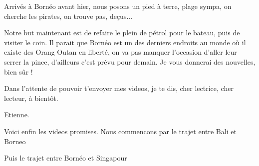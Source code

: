 \begin{multicols}{2}
Arrivés à Bornéo avant hier, nous posons un pied à terre, plage sympa, on cherche les pirates, on trouve pas, deçus...

Notre but maintenant est de refaire le plein de pétrol pour le bateau, puis de visiter le coin. Il parait que Bornéo est un des derniers endroits au monde où il existe des Orang Outan en liberté, on va pas manquer l'occasion d'aller leur serrer la pince, d'ailleurs c'est prévu pour demain. Je vous donnerai des nouvelles, bien sûr !

Dans l'attente de pouvoir t'envoyer mes videos, je te dis, cher lectrice, cher lecteur, à bientôt.

Etienne.

Voici enfin les videos promises. Nous commencons par le trajet entre Bali et Borneo



Puis le trajet entre Bornéo et Singapour



\end{multicols}
